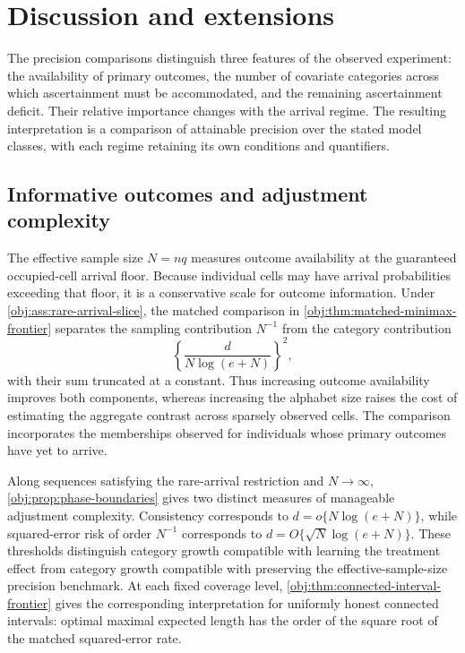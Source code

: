 \documentclass[11pt]{article}
\begin{document}
\section{Discussion and extensions}

The precision comparisons distinguish three features of the observed experiment: the availability of primary outcomes, the number of covariate categories across which ascertainment must be accommodated, and the remaining ascertainment deficit. Their relative importance changes with the arrival regime. The resulting interpretation is a comparison of attainable precision over the stated model classes, with each regime retaining its own conditions and quantifiers.

\subsection{Informative outcomes and adjustment complexity}

The effective sample size \(N=nq\) measures outcome availability at the guaranteed occupied-cell arrival floor. Because individual cells may have arrival probabilities exceeding that floor, it is a conservative scale for outcome information. Under \cref{obj:ass:rare-arrival-slice}, the matched comparison in \cref{obj:thm:matched-minimax-frontier} separates the sampling contribution \(N^{-1}\) from the category contribution
\[
\left\{\frac{d}{N\log(e+N)}\right\}^{2},
\]
with their sum truncated at a constant. Thus increasing outcome availability improves both components, whereas increasing the alphabet size raises the cost of estimating the aggregate contrast across sparsely observed cells. The comparison incorporates the memberships observed for individuals whose primary outcomes have yet to arrive.

Along sequences satisfying the rare-arrival restriction and \(N\to\infty\), \cref{obj:prop:phase-boundaries} gives two distinct measures of manageable adjustment complexity. Consistency corresponds to \(d=o\{N\log(e+N)\}\), while squared-error risk of order \(N^{-1}\) corresponds to \(d=O\{\sqrt N\log(e+N)\}\). These thresholds distinguish category growth compatible with learning the treatment effect from category growth compatible with preserving the effective-sample-size precision benchmark. At each fixed coverage level, \cref{obj:thm:connected-interval-frontier} gives the corresponding interpretation for uniformly honest connected intervals: optimal maximal expected length has the order of the square root of the matched squared-error rate.
\end{document}
